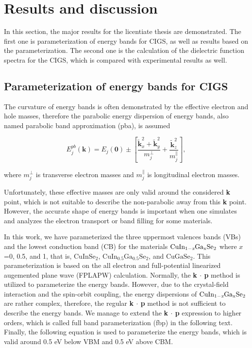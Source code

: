 \documentclass[a4paper, 12pt, titlepage,oneside,drop]{kthesis}
\begin{document}
\chapter{Results and discussion}

In this section, the major results for the licentiate thesis are demonstrated. The first one is parameterization of energy bands for CIGS, as well as results based on the parameterization. The second one is the calculation of the 
dielectric function spectra for the CIGS, which is compared with experimental results as well.

\section{Parameterization of energy bands for CIGS}


The curvature of energy bands is often demonstrated by the effective electron and hole masses, therefore the parabolic energy dispersion of energy bands, also named parabolic band approximation (pba), is 
assumed

\begin{equation}\label{parabolic}
E_{j}^{pb}(\textbf{k}) = E_{j}(\textbf{0}) \pm \left[ \frac{\widetilde{\textbf{k}}_{x}^{2}+\widetilde{ \textbf{k}}_{y}^{2}}{m_{j}^{\perp}} + \frac{\widetilde{\textbf{k}}_{z}^{2}}{m_{j}^{\parallel}} \right],
\end{equation}

where $m_{j}^{\perp}$ is transverse electron masses and $m_{j}^{\parallel}$ is longitudinal electron masses.
 
Unfortunately, these effective masses are only valid around the considered {\textbf k} point, which is not suitable to describe the non-parabolic away from this {\textbf k} point.
However, the accurate shape of energy bands is important when one simulates and analyzes the electron transport or band filling for some materials.

In this work, we have parameterized the three uppermost valences bands (VBs) and the lowest conduction band (CB) for the materials $\mathrm { CuIn_{1-\textit{x}}Ga_{x}Se_2}$ where $x$=0, 0.5, and 1, that is,
$\mathrm{CuInSe_2}$, $\mathrm{CuIn_{0.5}Ga_{0.5}Se_2}$, and $\mathrm{CuGaSe_2}$. This parameterization is based on the all electron and full-potential linearized augemented plane wave (FPLAPW) calculation.
Normally, the \textbf{k $\cdot$ p} method is utilized to parameterize the energy bands. However, due to the crystal-field interaction and the spin-orbit coupling, 
the energy dispersions of $\mathrm { CuIn_{1-\textit{x}}Ga_{x}Se_2}$ are rather complex, therefore, the regular \textbf{k $\cdot$ p} method is not sufficient to describe the energy bands. 
We manage to extend the \textbf{k $\cdot$ p} expression to higher orders, which is called full band parameterization (fbp) in the following text. Finally, the following equation is used to parameterize the energy bands,
 which is valid around 0.5 eV below VBM and 0.5 eV above CBM.
\end{document}

